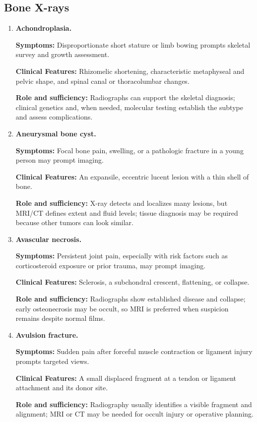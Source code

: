 \subsection{Bone X-rays}
\begin{enumerate}[leftmargin=*,itemsep=0.45em,topsep=0.4em]
\item \textbf{Achondroplasia.}\par\noindent\textbf{Symptoms:} Disproportionate short stature or limb bowing prompts skeletal survey and growth assessment.\par\noindent\textbf{Clinical Features:} Rhizomelic shortening, characteristic metaphyseal and pelvic shape, and spinal canal or thoracolumbar changes.\par\noindent\textbf{Role and sufficiency:} Radiographs can support the skeletal diagnosis; clinical genetics and, when needed, molecular testing establish the subtype and assess complications.
\item \textbf{Aneurysmal bone cyst.}\par\noindent\textbf{Symptoms:} Focal bone pain, swelling, or a pathologic fracture in a young person may prompt imaging.\par\noindent\textbf{Clinical Features:} An expansile, eccentric lucent lesion with a thin shell of bone.\par\noindent\textbf{Role and sufficiency:} X-ray detects and localizes many lesions, but MRI/CT defines extent and fluid levels; tissue diagnosis may be required because other tumors can look similar.
\item \textbf{Avascular necrosis.}\par\noindent\textbf{Symptoms:} Persistent joint pain, especially with risk factors such as corticosteroid exposure or prior trauma, may prompt imaging.\par\noindent\textbf{Clinical Features:} Sclerosis, a subchondral crescent, flattening, or collapse.\par\noindent\textbf{Role and sufficiency:} Radiographs show established disease and collapse; early osteonecrosis may be occult, so MRI is preferred when suspicion remains despite normal films.
\item \textbf{Avulsion fracture.}\par\noindent\textbf{Symptoms:} Sudden pain after forceful muscle contraction or ligament injury prompts targeted views.\par\noindent\textbf{Clinical Features:} A small displaced fragment at a tendon or ligament attachment and its donor site.\par\noindent\textbf{Role and sufficiency:} Radiography usually identifies a visible fragment and alignment; MRI or CT may be needed for occult injury or operative planning.

\end{enumerate}
